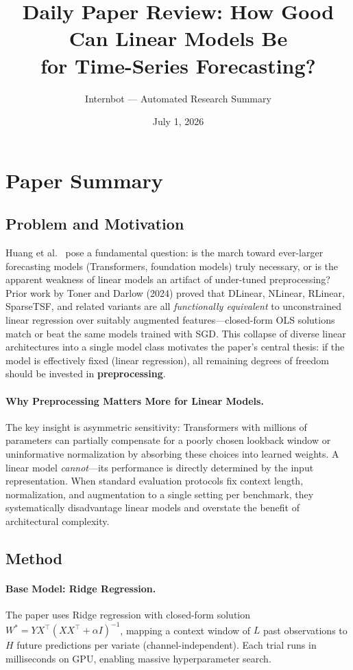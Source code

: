 \documentclass[11pt,a4paper]{article}
\title{Daily Paper Review: How Good Can Linear Models Be\\for Time-Series Forecasting?}
\author{Internbot --- Automated Research Summary}
\date{July 1, 2026}
\begin{document}
\maketitle

\section{Paper Summary}

\subsection{Problem and Motivation}

Huang et al.~\cite{huang2026linear} pose a fundamental question: is the march toward ever-larger forecasting models (Transformers, foundation models) truly necessary, or is the apparent weakness of linear models an artifact of under-tuned preprocessing? Prior work by Toner and Darlow (2024) proved that DLinear, NLinear, RLinear, SparseTSF, and related variants are all \emph{functionally equivalent} to unconstrained linear regression over suitably augmented features---closed-form OLS solutions match or beat the same models trained with SGD. This collapse of diverse linear architectures into a single model class motivates the paper's central thesis: if the model is effectively fixed (linear regression), all remaining degrees of freedom should be invested in \textbf{preprocessing}.

\paragraph{Why Preprocessing Matters More for Linear Models.} The key insight is asymmetric sensitivity: Transformers with millions of parameters can partially compensate for a poorly chosen lookback window or uninformative normalization by absorbing these choices into learned weights. A linear model \emph{cannot}---its performance is directly determined by the input representation. When standard evaluation protocols fix context length, normalization, and augmentation to a single setting per benchmark, they systematically disadvantage linear models and overstate the benefit of architectural complexity.

\subsection{Method}

\paragraph{Base Model: Ridge Regression.} The paper uses Ridge regression with closed-form solution $W^* = YX^\top(XX^\top + \alpha I)^{-1}$, mapping a context window of $L$ past observations to $H$ future predictions per variate (channel-independent). Each trial runs in milliseconds on GPU, enabling massive hyperparameter search.
\end{document}
